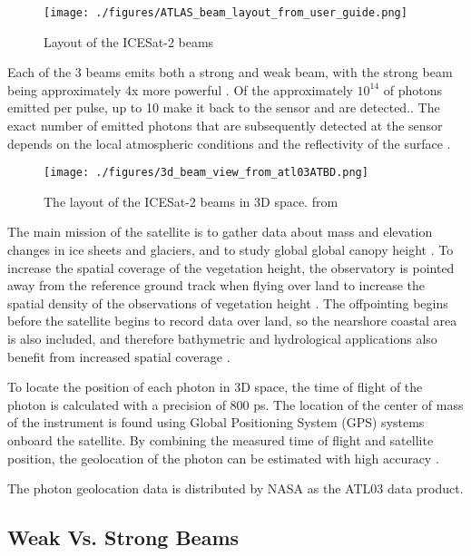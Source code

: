 \begin{figure}
      \centering
      \texttt{[image: ./figures/ATLAS\_beam\_layout\_from\_user\_guide.png]}
      \caption{Layout of the ICESat-2 beams}
\end{figure}

Each of the 3 beams emits both a strong and weak beam, with the strong beam being approximately 4x more powerful \parencite{Neumann2019d}. Of the approximately \(10^{14}\) of photons emitted per pulse, up to  10 make it back to the sensor and are detected.\parencite{Neumann2019d}. The exact number of emitted photons that are subsequently detected at the sensor depends on the local atmospheric conditions and the reflectivity of the surface \parencite{Neumann2019e}.
\begin{figure}[htbp]
      \centering
      \texttt{[image: ./figures/3d\_beam\_view\_from\_atl03ATBD.png]}
      \caption{The layout of the ICESat-2 beams in 3D space. from \cite{Neumann2019d}}
      \label{3d-beams}
\end{figure}


The main mission of the satellite is to gather data about mass and elevation changes in ice sheets and glaciers, and to study global global canopy height \parencite{Markus2017}. To increase the spatial coverage of the vegetation height, the observatory is pointed away from the reference ground track when flying over land to increase the spatial density of the observations of vegetation height \parencite{Markus2017}. The offpointing begins before the satellite begins to record data over land, so the nearshore coastal area is also included, and therefore bathymetric and hydrological applications also benefit from increased spatial coverage \parencite{Magruder2021}.

To locate the position of each photon in 3D space, the time of flight of the photon is calculated with a precision of 800 ps\parencite{Neumann2019d}. The location of the center of mass of the instrument is found using Global Positioning System (GPS) systems onboard the satellite. By combining the measured time of flight and satellite position, the geolocation of the photon can be estimated with high accuracy \parencite{Neumann2019d}.

The photon geolocation data is distributed by NASA as the ATL03 data product.

\subsection{Weak Vs. Strong Beams}


